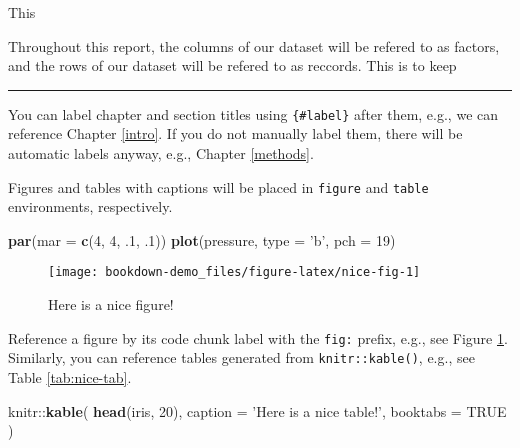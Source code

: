 \documentclass[12pt,]{book}
\newenvironment{Shaded}{\begin{snugshade}}{\end{snugshade}}
\newcommand{\KeywordTok}[1]{\textcolor[rgb]{0.13,0.29,0.53}{\textbf{{#1}}}}
\newcommand{\DataTypeTok}[1]{\textcolor[rgb]{0.13,0.29,0.53}{{#1}}}
\newcommand{\DecValTok}[1]{\textcolor[rgb]{0.00,0.00,0.81}{{#1}}}
\newcommand{\StringTok}[1]{\textcolor[rgb]{0.31,0.60,0.02}{{#1}}}
\newcommand{\OtherTok}[1]{\textcolor[rgb]{0.56,0.35,0.01}{{#1}}}
\newcommand{\NormalTok}[1]{{#1}}
\theoremstyle{definition}
\theoremstyle{definition}
\theoremstyle{remark}
\begin{document}
This

Throughout this report, the columns of our dataset will be refered to as
factors, and the rows of our dataset will be refered to as reccords.
This is to keep

\begin{center}\rule{0.5\linewidth}{\linethickness}\end{center}

You can label chapter and section titles using \texttt{\{\#label\}}
after them, e.g., we can reference Chapter \ref{intro}. If you do not
manually label them, there will be automatic labels anyway, e.g.,
Chapter \ref{methods}.

Figures and tables with captions will be placed in \texttt{figure} and
\texttt{table} environments, respectively.

\begin{Shaded}
\begin{Highlighting}[]
\KeywordTok{par}\NormalTok{(}\DataTypeTok{mar =} \KeywordTok{c}\NormalTok{(}\DecValTok{4}\NormalTok{, }\DecValTok{4}\NormalTok{, .}\DecValTok{1}\NormalTok{, .}\DecValTok{1}\NormalTok{))}
\KeywordTok{plot}\NormalTok{(pressure, }\DataTypeTok{type =} \StringTok{'b'}\NormalTok{, }\DataTypeTok{pch =} \DecValTok{19}\NormalTok{)}
\end{Highlighting}
\end{Shaded}

\begin{figure}

{\centering \texttt{[image: bookdown-demo\_files/figure-latex/nice-fig-1]} 

}

\caption{Here is a nice figure!}\label{fig:nice-fig}
\end{figure}

Reference a figure by its code chunk label with the \texttt{fig:}
prefix, e.g., see Figure \ref{fig:nice-fig}. Similarly, you can
reference tables generated from \texttt{knitr::kable()}, e.g., see Table
\ref{tab:nice-tab}.

\begin{Shaded}
\begin{Highlighting}[]
\NormalTok{knitr::}\KeywordTok{kable}\NormalTok{(}
  \KeywordTok{head}\NormalTok{(iris, }\DecValTok{20}\NormalTok{), }\DataTypeTok{caption =} \StringTok{'Here is a nice table!'}\NormalTok{,}
  \DataTypeTok{booktabs =} \OtherTok{TRUE}
\NormalTok{)}
\end{Highlighting}
\end{Shaded}
\end{document}
